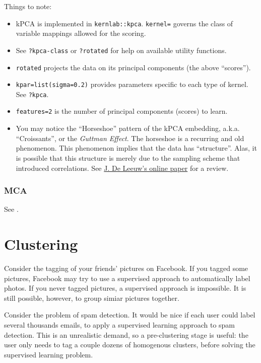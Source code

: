 \documentclass[]{book}
\providecommand{\tightlist}{%
  \setlength{\itemsep}{0pt}\setlength{\parskip}{0pt}}
\theoremstyle{definition}
\theoremstyle{definition}
\theoremstyle{definition}
\theoremstyle{remark}
\let\BeginKnitrBlock\begin \let\EndKnitrBlock\end
\begin{document}
Things to note:

\begin{itemize}
\tightlist
\item
  kPCA is implemented in \texttt{kernlab::kpca}. \texttt{kernel=}
  governs the class of variable mappings allowed for the scoring.
\item
  See \texttt{?\textquotesingle{}kpca-class\textquotesingle{}} or
  \texttt{?rotated} for help on available utility functions.
\item
  \texttt{rotated} projects the data on its principal components (the
  above ``scores'').
\item
  \texttt{kpar=list(sigma=0.2)} provides parameters specific to each
  type of kernel. See \texttt{?kpca}.
\item
  \texttt{features=2} is the number of principal components (scores) to
  learn.
\item
  You may notice the ``Horseshoe'' pattern of the kPCA embedding, a.k.a.
  ``Croissants'', or the \emph{Guttman Effect}. The horseshoe is a
  recurring and old phenomenon. This phenomenon implies that the data
  has ``structure''. Alas, it is possible that this structure is merely
  due to the sampling scheme that introduced correlations. See
  \href{https://rpubs.com/deleeuw/133786}{J. De Leeuw's online paper}
  for a review.
\end{itemize}

\subsubsection{MCA}\label{mca}

See \citet{izenman2008modern}.

\section{Clustering}\label{cluster}

\BeginKnitrBlock{example}
\protect\hypertarget{exm:photos}{}{\label{exm:photos} }Consider the tagging
of your friends' pictures on Facebook. If you tagged some pictures,
Facebook may try to use a supervised approach to automatically label
photos. If you never tagged pictures, a supervised approach is
impossible. It is still possible, however, to group simiar pictures
together.
\EndKnitrBlock{example}

\BeginKnitrBlock{example}
\protect\hypertarget{exm:spam}{}{\label{exm:spam} }Consider the problem of
spam detection. It would be nice if each user could label several
thousands emails, to apply a supervised learning approach to spam
detection. This is an unrealistic demand, so a pre-clustering stage is
useful: the user only needs to tag a couple dozens of homogenous
clusters, before solving the supervised learning problem.
\EndKnitrBlock{example}
\end{document}
